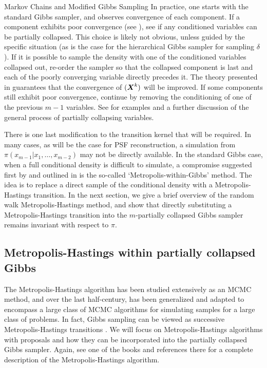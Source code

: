 \begin{chapter}{Markov Chains and Modified Gibbs Sampling}
In practice, one starts with the standard Gibbs sampler, and observes convergence of each component.
If a component exhibits poor convergence (see ), see if any conditioned variables can be partially collapsed.
This choice is likely not obvious, unless guided by the specific situation (as is the case for the hierarchical Gibbs sampler for sampling $\delta$).
If it is possible to sample the density with one of the conditioned variables collapsed out, re-order the sampler so that the collapsed component is last and each of the poorly converging variable directly precedes it. 
The theory presented in \citep{van2008partially} guarantees that the convergence of $(\mbox{\boldmath$X$}^k)$ will be improved.
If some components still exhibit poor convergence, continue by removing the conditioning of one of the previous $m-1$ variables.
See \citep{van2008partially} for examples and a further discussion of the general process of partially collapsing variables.

There is one last modification to the transition kernel that will be required.
In many cases, as will be the case for PSF reconstruction, a simulation from $\pi(x_{m-1}|x_1,\dots, x_{m-2})$ may not be directly available.
In the standard Gibbs case, when a full conditional density is difficult to simulate, a compromise suggested first by \citep{muller1992alternatives} and outlined in \citep{robert2013monte} is the so-called `Metropolis-within-Gibbs' method.
The idea is to replace a direct sample of the conditional density with a Metropolis-Hastings transition. 
In the next section, we give a brief overview of the random walk Metropolis-Hastings method, and show that directly substituting a Metropolis-Hastings transition into the $m$-partially collapsed Gibbs sampler remains invariant with respect to $\pi$.

\subsection{Metropolis-Hastings within partially collapsed Gibbs}
The Metropolis-Hastings algorithm \citep{metropolis1953equation} has been studied extensively as an MCMC method, and over the last half-century, has been generalized and adapted to encompass a large class of MCMC algorithms for simulating samples for a large class of problems. 
In fact, Gibbs sampling can be viewed as successive Metropolis-Hastings transitions \citep{robert2013monte}.
We will focus on Metropolis-Hastings algorithms with proposals and how they can be incorporated into the partially collapsed Gibbs sampler.
Again, see one of the books \citep{calvetti2007introduction,liu2008monte,robert2013monte} and references there for a complete description of the Metropolis-Hastings algorithm.


\end{chapter}

